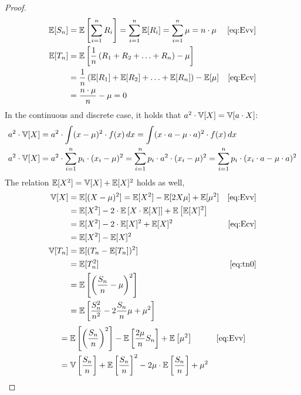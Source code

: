 \begin{proof}
  \begin{align}
      \mathbb E[S_n] &= \mathbb E\left[\sum_{i=1}^n R_i\right] = \sum_{i=1}^n \mathbb E[R_i] = \sum_{i=1}^n \mu = n \cdot \mu & \eqref{eq:Evv} \\
      \mathbb E[T_n] &= \mathbb E\left[\frac{1}{n}\left(R_1 + R_2 + \ldots + R_n\right) - \mu\right] \nonumber\\
              &= \frac1n \left(\mathbb E[R_1] + \mathbb E[R_2] + \ldots + \mathbb E[R_n]\right) - \mathbb E[\mu] & \eqref{eq:Ecv} \nonumber\\
              &= \frac{n \cdot \mu}{n} - \mu = 0 \label{eq:tn0}
  \end{align}
  In the continuous and discrete case, it holds that $a^2 \cdot \mathbb V[X] = \mathbb V[a \cdot X]$:
  \begin{align}
    a^2 \cdot \mathbb V[X] &= a^2 \cdot \int (x - \mu)^2 \cdot f(x) \, dx = \int (x \cdot a - \mu \cdot a)^2 \cdot f(x) \, dx \nonumber \\
    a^2 \cdot \mathbb V[X] &= a^2 \cdot \sum_{i=1}^n p_i \cdot (x_i - \mu)^2 = \sum_{i=1}^n p_i \cdot a^2 \cdot (x_i - \mu)^2 = \sum_{i=1}^n p_i \cdot (x_i \cdot a - \mu \cdot a)^2 \nonumber
  \end{align}
  The relation $\mathbb E[X^2] = \mathbb V[X] + \mathbb E[X]^2$ holds as well,
  \begin{align}
    \mathbb V[X] &= \mathbb E[(X - \mu)^2] = \mathbb E[X^2] - \mathbb E[2X\mu] + \mathbb E[\mu^2] \nonumber & \eqref{eq:Evv} \\
            &= \mathbb E[X^2] - 2 \cdot \mathbb E\left[X \cdot \mathbb E[X]\right] + \mathbb E\left[\mathbb E[X]^2\right] \\
            &= \mathbb E[X^2] - 2 \cdot \mathbb E[X]^2 + \mathbb E[X]^2 & \eqref{eq:Ecv} \nonumber \\
            &= \mathbb E[X^2] - \mathbb E[X]^2 \\
    \mathbb V[T_n] &= \mathbb E[(T_n - \mathbb E[T_n])^2] \nonumber\\
              &= \mathbb E[T_n^2] & \eqref{eq:tn0} \nonumber\\
              &= \mathbb E\left[\left(\frac{S_n}{n} - \mu\right)^2\right] \nonumber\\
              &= \mathbb E\left[\frac{S_n^2}{n^2} - 2\frac{S_n}{n}\mu + \mu^2\right] \nonumber
  \end{align}
  \begin{align}
              &= \E\left[\left(\frac{S_n}{n}\right)^2\right] - \E\left[\frac{2\mu}{n} S_n\right] + \E\left[\mu^2\right] & \eqref{eq:Evv} \nonumber\\
              &= \Var\left[\frac{S_n}{n}\right] + \E\left[\frac{S_n}{n}\right]^2 - 2\mu \cdot \E\left[\frac{S_n}{n}\right] + \mu^2 \nonumber \\

\end{align}
\end{proof}
